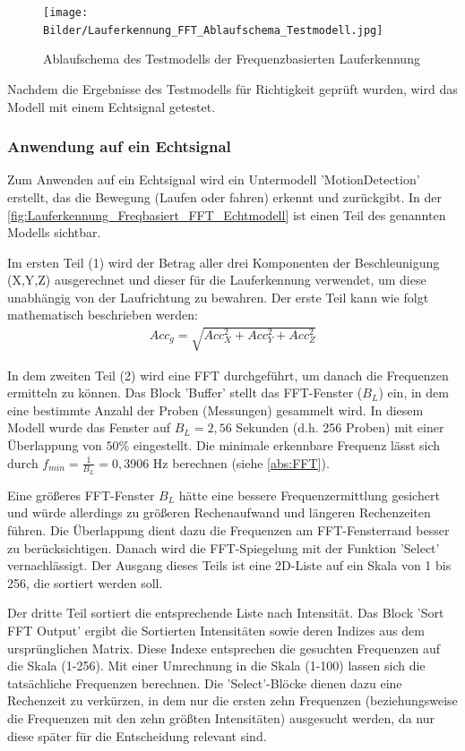 \begin{figure}[H]
	\centering
	\texttt{[image: Bilder/Lauferkennung\_FFT\_Ablaufschema\_Testmodell.jpg]}
	\caption{Ablaufschema des Testmodells der Frequenzbasierten Lauferkennung}
	\label{fig:Lauferkennung_FFT_Ablaufschema_Testmodell}
\end{figure}

Nachdem die Ergebnisse des Testmodells für Richtigkeit geprüft wurden, wird das Modell mit einem Echtsignal getestet. 

\subsubsection{Anwendung auf ein Echtsignal}

Zum Anwenden auf ein Echtsignal wird ein Untermodell 'MotionDetection' erstellt, das die Bewegung (Laufen oder fahren) erkennt und zurückgibt.
In der \autoref{fig:Lauferkennung_Freqbasiert_FFT_Echtmodell} ist einen Teil des genannten Modells sichtbar. 

Im ersten Teil (1) wird der Betrag aller drei Komponenten der Beschleunigung (X,Y,Z) ausgerechnet und dieser für die Lauferkennung verwendet, um diese unabhängig von der Laufrichtung zu bewahren. Der erste Teil kann wie folgt mathematisch beschrieben werden:
\begin{align*}
	Acc_g = \sqrt{ Acc_X^2 + Acc_Y^2 + Acc_Z^2}
\end{align*}

In dem zweiten Teil (2) wird eine FFT durchgeführt, um danach die Frequenzen ermitteln zu können. Das Block 'Buffer' stellt das FFT-Fenster ($B_L$) ein, in dem eine bestimmte Anzahl der Proben (Messungen) gesammelt wird. In diesem Modell wurde das Fenster auf $B_L = 2,56$ Sekunden (d.h. 256 Proben) mit einer Überlappung von $50\%$ eingestellt. Die minimale erkennbare Frequenz lässt sich durch $f_{min} = \frac{1}{B_L} = 0,3906$ Hz berechnen (siehe \autoref{abs:FFT}).

Eine größeres FFT-Fenster $B_L$ hätte eine bessere Frequenzermittlung gesichert und würde allerdings zu größeren Rechenaufwand und längeren Rechenzeiten führen. Die Überlappung dient dazu die Frequenzen am FFT-Fensterrand besser zu berücksichtigen. Danach wird die FFT-Spiegelung mit der Funktion 'Select' vernachlässigt. Der Ausgang dieses Teils ist eine 2D-Liste auf ein Skala von 1 bis 256, die sortiert werden soll.

Der dritte Teil sortiert die entsprechende Liste nach Intensität. Das Block 'Sort FFT Output' ergibt die Sortierten Intensitäten sowie deren Indizes aus dem ursprünglichen Matrix. Diese Indexe entsprechen die gesuchten Frequenzen auf die Skala (1-256). Mit einer Umrechnung in die Skala (1-100) lassen sich die tatsächliche Frequenzen berechnen. Die 'Select'-Blöcke dienen dazu eine Rechenzeit zu verkürzen, in dem nur die ersten zehn Frequenzen (beziehungsweise die Frequenzen mit den zehn größten Intensitäten) ausgesucht werden, da nur diese später für die Entscheidung relevant sind.

